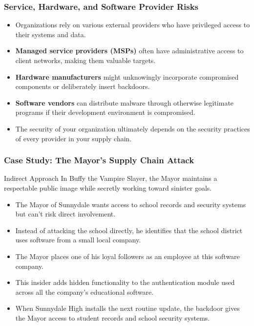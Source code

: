 \documentclass{beamer}
\begin{document}
\begin{frame}
    \frametitle{Service, Hardware, and Software Provider Risks}
    
    \begin{itemize}
        \item Organizations rely on various external providers who have privileged access to their systems and data.
        \item \textbf{Managed service providers (MSPs)} often have administrative access to client networks, making them valuable targets.
        \item \textbf{Hardware manufacturers} might unknowingly incorporate compromised components or deliberately insert backdoors.
        \item \textbf{Software vendors} can distribute malware through otherwise legitimate programs if their development environment is compromised.
        \item The security of your organization ultimately depends on the security practices of every provider in your supply chain.
    \end{itemize}
\end{frame}

\begin{frame}
    \frametitle{Case Study: The Mayor's Supply Chain Attack}
    
    \begin{block}{Indirect Approach}
        In Buffy the Vampire Slayer, the Mayor maintains a respectable public image while secretly working toward sinister goals.
    \end{block}
    
    \begin{itemize}
        \item The Mayor of Sunnydale wants access to school records and security systems but can't risk direct involvement.
        \item Instead of attacking the school directly, he identifies that the school district uses software from a small local company.
        \item The Mayor places one of his loyal followers as an employee at this software company.
        \item This insider adds hidden functionality to the authentication module used across all the company's educational software.
        \item When Sunnydale High installs the next routine update, the backdoor gives the Mayor access to student records and school security systems.
    \end{itemize}
\end{frame}
\end{document}
